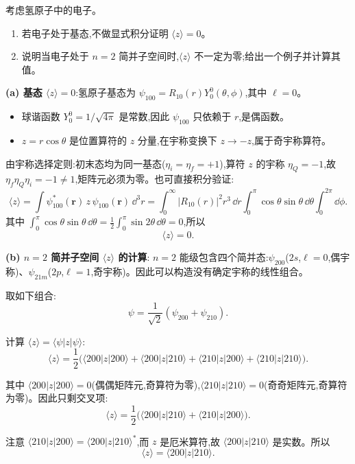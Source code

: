 \begin{question}
考虑氢原子中的电子。
\begin{enumerate}
\item 若电子处于基态,不做显式积分证明 $\langle z\rangle=0$。
\item 说明当电子处于 $n=2$ 简并子空间时,$\langle z\rangle$ 不一定为零;给出一个例子并计算其值。
\end{enumerate}
\end{question}
\begin{solution}
	\textbf{(a) 基态 $\langle z\rangle=0$}:氢原子基态为 $\psi_{100}=R_{10}(r)Y_0^0(\theta,\phi)$,其中 $\ell=0$。
	\begin{itemize}
	\item 球谐函数 $Y_0^0=1/\sqrt{4\pi}$ 是常数,因此 $\psi_{100}$ 只依赖于 $r$,是偶函数。
	\item $z=r\cos\theta$ 是位置算符的 $z$ 分量,在宇称变换下 $z\to -z$,属于奇宇称算符。
	\end{itemize}

	由宇称选择定则:初末态均为同一基态($\eta_i=\eta_f=+1$),算符 $z$ 的宇称 $\eta_Q=-1$,故 $\eta_f\eta_Q\eta_i=-1\neq1$,矩阵元必须为零。也可直接积分验证:
	\[
	\langle z\rangle = \int \psi_{100}^*(\mathbf r)\,z\,\psi_{100}(\mathbf r)\,\dd^3 r
	= \int_0^\infty |R_{10}(r)|^2 r^3\,\dd r\int_0^\pi \cos\theta\sin\theta\,\dd\theta\int_0^{2\pi}\dd\phi.
	\]
	其中 $\int_0^\pi\cos\theta\sin\theta\,\dd\theta = \frac12\int_0^\pi\sin2\theta\,\dd\theta=0$,所以
	\[
	\boxed{\langle z\rangle = 0}.
	\]

	\textbf{(b) $n=2$ 简并子空间 $\langle z\rangle$ 的计算}:
	$n=2$ 能级包含四个简并态:$\psi_{200}$($2s$,$\ell=0$,偶宇称)、$\psi_{21m}$($2p$,$\ell=1$,奇宇称)。因此可以构造没有确定宇称的线性组合。

	取如下组合:
	\[
	\psi = \frac{1}{\sqrt{2}}(\psi_{200}+\psi_{210}).
	\]

	计算 $\langle z\rangle = \langle\psi|z|\psi\rangle$:
	\[
	\langle z\rangle = \frac12\Big(\langle200|z|200\rangle + \langle200|z|210\rangle + \langle210|z|200\rangle + \langle210|z|210\rangle\Big).
	\]

	其中 $\langle200|z|200\rangle=0$(偶偶矩阵元,奇算符为零),$\langle210|z|210\rangle=0$(奇奇矩阵元,奇算符为零)。因此只剩交叉项:
	\[
	\langle z\rangle = \frac12\Big(\langle200|z|210\rangle + \langle210|z|200\rangle\Big).
	\]

	注意 $\langle210|z|200\rangle = \langle200|z|210\rangle^*$,而 $z$ 是厄米算符,故 $\langle200|z|210\rangle$ 是实数。所以
	\[
	\langle z\rangle = \langle200|z|210\rangle.
	\]


\end{solution}
